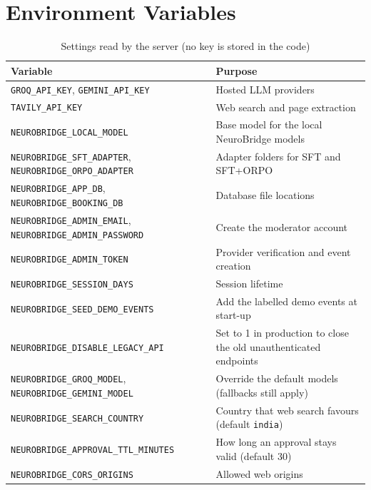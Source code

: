 \documentclass[11pt,a4paper]{article}
\newcommand{\code}[1]{\texttt{#1}}
\begin{document}
\section{Environment Variables}\label{app:env}
\begin{table}[H]
\centering
\caption{Settings read by the server (no key is stored in the code)}
\label{tab:envvars}
\small
\begin{tabularx}{\textwidth}{@{}lY@{}}
\toprule
\textbf{Variable} & \textbf{Purpose}\\
\midrule
\code{GROQ\_API\_KEY}, \code{GEMINI\_API\_KEY} & Hosted LLM providers\\
\code{TAVILY\_API\_KEY} & Web search and page extraction\\
\code{NEUROBRIDGE\_LOCAL\_MODEL} & Base model for the local NeuroBridge models\\
\code{NEUROBRIDGE\_SFT\_ADAPTER}, \code{NEUROBRIDGE\_ORPO\_ADAPTER} & Adapter folders for SFT and SFT+ORPO\\
\code{NEUROBRIDGE\_APP\_DB}, \code{NEUROBRIDGE\_BOOKING\_DB} & Database file locations\\
\code{NEUROBRIDGE\_ADMIN\_EMAIL}, \code{NEUROBRIDGE\_ADMIN\_PASSWORD} & Create the moderator account\\
\code{NEUROBRIDGE\_ADMIN\_TOKEN} & Provider verification and event creation\\
\code{NEUROBRIDGE\_SESSION\_DAYS} & Session lifetime\\
\code{NEUROBRIDGE\_SEED\_DEMO\_EVENTS} & Add the labelled demo events at start-up\\
\code{NEUROBRIDGE\_DISABLE\_LEGACY\_API} & Set to 1 in production to close the old unauthenticated endpoints\\
\code{NEUROBRIDGE\_GROQ\_MODEL}, \code{NEUROBRIDGE\_GEMINI\_MODEL} & Override the default models (fallbacks still apply)\\
\code{NEUROBRIDGE\_SEARCH\_COUNTRY} & Country that web search favours (default \code{india})\\
\code{NEUROBRIDGE\_APPROVAL\_TTL\_MINUTES} & How long an approval stays valid (default 30)\\
\code{NEUROBRIDGE\_CORS\_ORIGINS} & Allowed web origins\\
\bottomrule
\end{tabularx}
\end{table}
\end{document}
